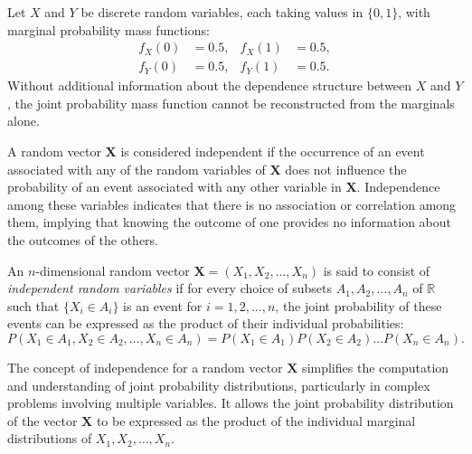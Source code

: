 \begin{example}
Let $X$ and $Y$ be discrete random variables, each taking values in $\{0, 1\}$, with marginal probability mass functions:
\[
\begin{aligned}
f_{X}(0) &= 0.5, & f_{X}(1) &= 0.5, \\
f_{Y}(0) &= 0.5, & f_{Y}(1) &= 0.5.
\end{aligned}
\]
Without additional information about the dependence structure between $X$ and $Y$, the joint probability mass function cannot be reconstructed from the marginals alone.
\end{example}

A random vector $\mathbf{X}$ is considered independent if the occurrence of an event associated with any of the random variables of $\mathbf{X}$ does not influence the probability of an event associated with any other variable in $\mathbf{X}$. Independence among these variables indicates that there is no association or correlation among them, implying that knowing the outcome of one provides no information about the outcomes of the others.

\begin{definition}\label{def:independent_random_variables}
An $n$-dimensional random vector $\mathbf{X} = (X_{1}, X_{2}, \ldots, X_{n})$ is said to consist of \emph{independent random variables} if for every choice of subsets $A_{1}, A_{2}, \ldots, A_{n}$ of $\mathbb{R}$ such that $\{ X_{i} \in A_{i} \}$ is an event for $i = 1, 2, \ldots, n$, the joint probability of these events can be expressed as the product of their individual probabilities:
\[
P\left( X_{1} \in A_{1}, X_{2} \in A_{2}, \ldots, X_{n} \in A_{n} \right) = P\left( X_{1} \in A_{1} \right) P\left( X_{2} \in A_{2} \right) \ldots P\left( X_{n} \in A_{n} \right).
\]
\end{definition}

The concept of independence for a random vector $\mathbf{X}$ simplifies the computation and understanding of joint probability distributions, particularly in complex problems involving multiple variables. It allows the joint probability distribution of the vector $\mathbf{X}$ to be expressed as the product of the individual marginal distributions of $X_{1}, X_{2}, \ldots, X_{n}$.

